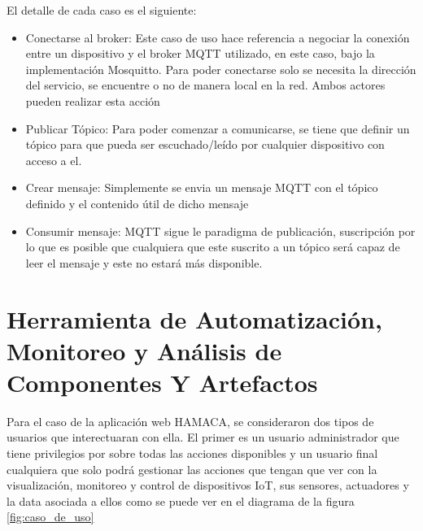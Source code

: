 El detalle de cada caso es el siguiente:
\begin{itemize}
\item Conectarse al broker: Este caso de uso hace referencia a negociar la conexión entre un dispositivo y el broker MQTT utilizado, en este caso, bajo la implementación Mosquitto. Para poder conectarse solo se necesita la dirección del servicio, se encuentre o no de manera local en la red. Ambos actores pueden realizar esta acción
\item Publicar Tópico: Para poder comenzar a comunicarse, se tiene que definir un tópico para que pueda ser escuchado/leído por cualquier dispositivo con acceso a el. 
\item Crear mensaje: Simplemente se envia un mensaje MQTT con el tópico definido y el contenido útil de dicho mensaje
\item Consumir mensaje: MQTT sigue le paradigma de publicación, suscripción por lo que es posible que cualquiera que este suscrito a un tópico será capaz de leer el mensaje y este no estará más disponible. 
\end{itemize}

\section{Herramienta de Automatización, Monitoreo y Análisis de Componentes Y Artefactos}
Para el caso de la aplicación web HAMACA, se consideraron dos tipos de usuarios que interectuaran con ella. El primer es un usuario administrador que tiene privilegios por sobre todas las acciones disponibles y un usuario final cualquiera que solo podrá gestionar las acciones que tengan que ver con la visualización, monitoreo y control de dispositivos IoT, sus sensores, actuadores y la data asociada a ellos como se puede ver en el diagrama de la figura \ref{fig:caso_de_uso}\\

